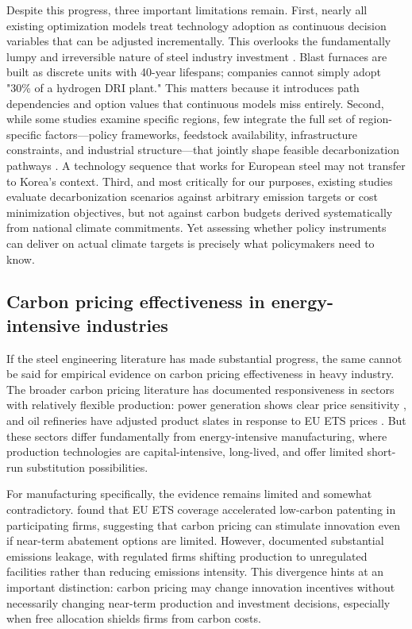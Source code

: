\documentclass[preprint,1p,authoryear]{elsarticle}
\begin{document}
Despite this progress, three important limitations remain. First, nearly all existing optimization models treat technology adoption as continuous decision variables that can be adjusted incrementally. This overlooks the fundamentally lumpy and irreversible nature of steel industry investment \citep{Griffin2020}. Blast furnaces are built as discrete units with 40-year lifespans; companies cannot simply adopt "30\% of a hydrogen DRI plant." This matters because it introduces path dependencies and option values that continuous models miss entirely. Second, while some studies examine specific regions, few integrate the full set of region-specific factors—policy frameworks, feedstock availability, infrastructure constraints, and industrial structure—that jointly shape feasible decarbonization pathways \citep{zhang2022steel}. A technology sequence that works for European steel may not transfer to Korea's context. Third, and most critically for our purposes, existing studies evaluate decarbonization scenarios against arbitrary emission targets or cost minimization objectives, but not against carbon budgets derived systematically from national climate commitments. Yet assessing whether policy instruments can deliver on actual climate targets is precisely what policymakers need to know.

\subsection{Carbon pricing effectiveness in energy-intensive industries}

If the steel engineering literature has made substantial progress, the same cannot be said for empirical evidence on carbon pricing effectiveness in heavy industry. The broader carbon pricing literature has documented responsiveness in sectors with relatively flexible production: power generation shows clear price sensitivity \citep{jarke2017carbon}, and oil refineries have adjusted product slates in response to EU ETS prices \citep{fowlie2016carbon}. But these sectors differ fundamentally from energy-intensive manufacturing, where production technologies are capital-intensive, long-lived, and offer limited short-run substitution possibilities.

For manufacturing specifically, the evidence remains limited and somewhat contradictory. \citet{calel2016innovation} found that EU ETS coverage accelerated low-carbon patenting in participating firms, suggesting that carbon pricing can stimulate innovation even if near-term abatement options are limited. However, \citet{martin2016industry} documented substantial emissions leakage, with regulated firms shifting production to unregulated facilities rather than reducing emissions intensity. This divergence hints at an important distinction: carbon pricing may change innovation incentives without necessarily changing near-term production and investment decisions, especially when free allocation shields firms from carbon costs.
\end{document}
